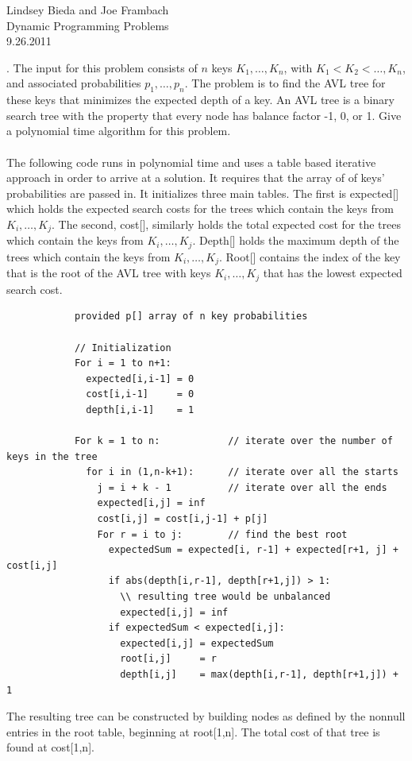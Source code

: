 \documentclass[10pt]{article}
\begin{document}
	\begin{flushright}
	Lindsey Bieda and Joe Frambach\\
	Dynamic Programming Problems\\
	9.26.2011
	\end{flushright}
	.	The input for this problem consists of $n$ keys $K_1, \ldots, K_n$, with $K_1 < K_2 < \ldots , K_n$, and associated
			probabilities $p_1, \ldots, p_n$. The problem is to find the AVL tree for these keys that minimizes the expected
			depth of a key.  An AVL tree is a binary search tree with the property that every node has balance
			factor -1, 0, or 1. Give a polynomial time algorithm for this problem.\\
			\\
			The following code runs in polynomial time and uses a table based iterative approach in order to arrive at a solution.
			It requires that the array of of keys' probabilities are passed in. It initializes three main tables. The first
			is expected[] which holds the expected search costs for the trees which contain the keys from $K_i, \ldots, K_j$.
			The second, cost[], similarly holds the total expected cost for the trees which contain the keys from $K_i, \ldots, K_j$.
			Depth[] holds the maximum depth of the trees which contain the keys from $K_i, \ldots, K_j$. Root[] contains the index
			of the key that is the root of the AVL tree with keys $K_i, \ldots, K_j$ that has the lowest expected search cost.
			\begin{verbatim}
			provided p[] array of n key probabilities 
			
			// Initialization
			For i = 1 to n+1:
			  expected[i,i-1] = 0
			  cost[i,i-1]     = 0
			  depth[i,i-1]    = 1
			  
			For k = 1 to n:            // iterate over the number of keys in the tree
			  for i in (1,n-k+1):      // iterate over all the starts
			    j = i + k - 1          // iterate over all the ends 
			    expected[i,j] = inf
			    cost[i,j] = cost[i,j-1] + p[j]
			    For r = i to j:        // find the best root
			      expectedSum = expected[i, r-1] + expected[r+1, j] + cost[i,j]
			      if abs(depth[i,r-1], depth[r+1,j]) > 1:
			        \\ resulting tree would be unbalanced
			        expected[i,j] = inf
			      if expectedSum < expected[i,j]:
			        expected[i,j] = expectedSum
			        root[i,j]     = r
			        depth[i,j]    = max(depth[i,r-1], depth[r+1,j]) + 1
			\end{verbatim}
			The resulting tree can be constructed by building nodes as defined by
			the nonnull entries in the root table, beginning at root[1,n].
			The total cost of that tree is found at cost[1,n]. 
			
\end{document}
